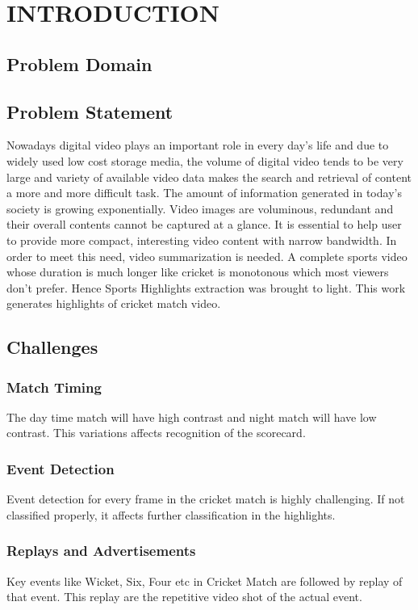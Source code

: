 
\chapter{INTRODUCTION} %
\section{Problem Domain}

\section{Problem Statement} %
Nowadays digital video plays an important role in every day’s life and due to widely used low cost storage media, the volume of digital video tends to be very large and variety of available video data makes the search and retrieval of content a more and more difficult task. The amount of information generated in today’s society is growing exponentially. Video images are voluminous, redundant and their overall contents cannot be captured at a glance. It is essential to help user to provide more compact, interesting video content with narrow bandwidth. In order to meet this need, video summarization is needed. A complete sports video whose duration is much longer like cricket is monotonous which most viewers don’t prefer. Hence Sports Highlights extraction was brought to light. This work generates highlights of cricket match video.
\section{Challenges}%
\subsection{Match Timing}
The day time match will have high contrast and night match will have low contrast. This variations affects recognition of the scorecard. 
\subsection{Event Detection}
Event detection for every frame in the cricket match is highly challenging. If not classified properly, it affects further classification in the highlights.
\subsection{Replays and Advertisements}
Key events like  Wicket, Six, Four etc in Cricket Match are followed by replay of that event. This replay are the repetitive video shot of the actual event.
